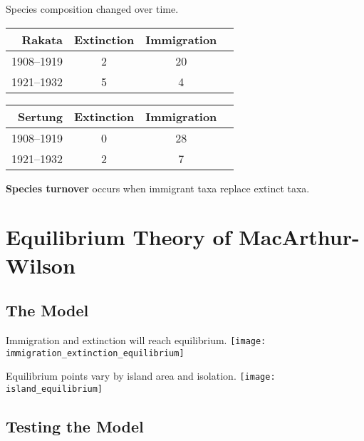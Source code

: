 \documentclass[xcolor=svgnames]{beamer}
\begin{document}
\begin{frame}{Species composition changed over time.}
	\centering
	\begin{tabular}{rccc}
		\toprule
		\textbf{Rakata} & Extinction & Immigration\\
		\midrule
		1908--1919 & 2 & 20 \\
		1921--1932 & 5 & 4  \\
		\bottomrule
	\end{tabular}

	\vspace{1\baselineskip}

	\begin{tabular}{rccc}
		\toprule
		\textbf{Sertung}& Extinction & Immigration\\
		\midrule
		1908--1919 & 0 & 28 \\
		1921--1932 & 2 & 7  \\
		\bottomrule
	\end{tabular}

	\vspace{1\baselineskip}

	\pause
	\begin{block}{}
		\textbf{Species turnover} occurs when immigrant taxa replace extinct taxa.
	\end{block}
\end{frame}

\section{Equilibrium Theory of MacArthur-Wilson}
\subsection{The Model}

\begin{frame}{Immigration and extinction will reach equilibrium.}
	\centering
		\texttt{[image: immigration\_extinction\_equilibrium]}
\end{frame}

\begin{frame}{Equilibrium points vary by island area and isolation.}
	\centering
		\texttt{[image: island\_equilibrium]}
\end{frame}

\subsection{Testing the Model}
\end{document}
